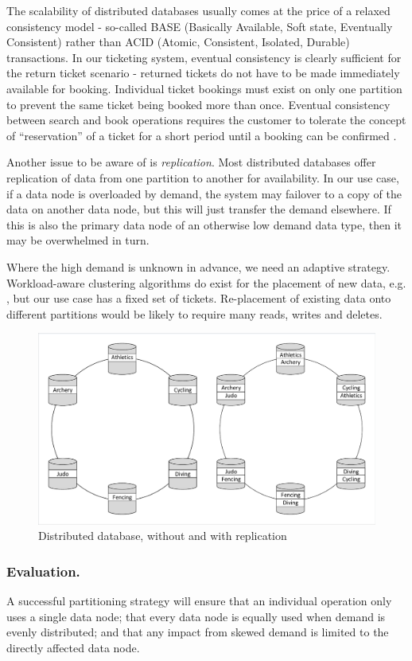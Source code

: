 The scalability of distributed databases usually comes at the price of a relaxed consistency model - so-called BASE (Basically Available, Soft state, Eventually Consistent) rather than ACID (Atomic, Consistent, Isolated, Durable) transactions.  In our ticketing system, eventual consistency is clearly sufficient for the return ticket scenario - returned tickets do not have to be made immediately available for booking.  Individual ticket bookings must exist on only one partition to prevent the same ticket being booked more than once.  Eventual consistency between search and book operations requires the customer to tolerate the concept of ``reservation'' of a ticket for a short period until a booking can be confirmed \cite{microservicesdata}\cite{cattell2011scalable}.

Another issue to be aware of is {\itshape replication}.   Most distributed databases offer replication of data from one partition to another for availability.  In our use case, if a data node is overloaded by demand, the system may failover to a copy of the data on another data node, but this will just transfer the demand elsewhere.  If this is also the primary data node of an otherwise low demand data type, then it may be overwhelmed in turn.

Where the high demand is unknown in advance, we need an adaptive strategy.  Workload-aware clustering algorithms do exist for the placement of new data, e.g. \cite{kamal2016workload}, but our use case has a fixed set of tickets.  Re-placement of existing data onto different partitions would be likely to require many reads, writes and deletes.

\begin{figure}
\caption{Distributed database, without and with replication}
\centering
\includegraphics[trim = 5 5 5 5, clip, width=\textwidth]{img/dbdist}
\end{figure}

\subsubsection{Evaluation.}

A successful partitioning strategy will ensure that an individual operation only uses a single data node; that every data node is equally used when demand is evenly distributed; and that any impact from skewed demand is limited to the directly affected data node.
